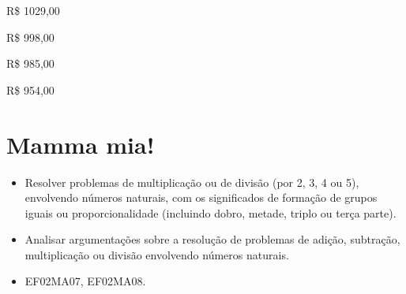 \begin{minipage}{.5\textwidth}
\begin{escolha}
\item R\$ 1029,00

\item R\$ 998,00

\item R\$ 985,00

\item R\$ 954,00
\end{escolha}
\end{minipage}

\chapter{Mamma mia!}

\vspace*{-1.5cm}


\begin{itemize}
\item Resolver problemas de multiplicação ou de divisão (por 2, 3, 4 ou 5),
envolvendo números naturais, com os significados de formação de grupos
iguais ou proporcionalidade (incluindo dobro, metade, triplo ou terça
parte).

\item Analisar argumentações sobre a resolução de problemas de adição,
subtração, multiplicação ou divisão envolvendo números naturais.
\end{itemize}


\begin{itemize}
	\item EF02MA07, EF02MA08.
\end{itemize}

